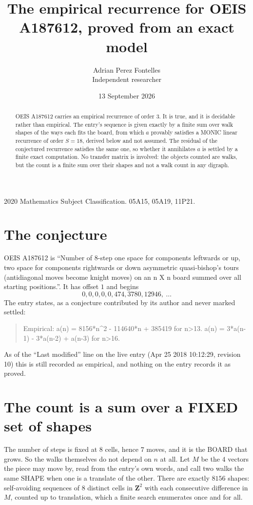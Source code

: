 \documentclass[11pt,a4paper]{article}
\title{The empirical recurrence for OEIS A187612, proved from an exact model}
\author{Adrian Perez Fontelles\\ \small Independent researcher}
\date{13 September 2026}
\theoremstyle{plain}
\theoremstyle{definition}
\begin{document}
\maketitle

\begin{abstract}
OEIS A187612 carries an empirical recurrence of order $3$. It is true, and it is
decidable rather than empirical. The entry's sequence is given exactly by a finite sum over walk shapes of the ways each fits the board, from
which $a$ provably satisfies a MONIC linear recurrence of order $S=18$, derived below and not
assumed. The residual of the conjectured recurrence satisfies the same one, so whether it
annihilates $a$ is settled by a finite exact computation. No transfer matrix is involved: the objects counted are walks, but the count is a finite sum over their shapes and not a walk count in any digraph.
\end{abstract}

\noindent\small 2020 Mathematics Subject Classification. 05A15, 05A19, 11P21.\normalsize

\section{The conjecture}

OEIS A187612 is ``Number of 8-step one space for components leftwards or up, two space for components rightwards or down asymmetric quasi-bishop's tours (antidiagonal moves become knight moves) on an n X n board summed over all starting positions.''. It has offset $1$ and begins
\[
0, 0, 0, 0, 0, 474, 3780, 12946,\ \dots
\]
The entry states, as a conjecture contributed by its author and never marked settled:
\begin{quote}
Empirical: a(n) = 8156*n\^{}2 - 114640*n + 385419 for n>13. a(n) = 3*a(n-1) - 3*a(n-2) + a(n-3) for n>16.
\end{quote}
As of the ``Last modified'' line on the live entry (Apr 25 2018 10:12:29, revision 10)
this is still recorded as empirical, and nothing on the entry records it as proved.

\section{The count is a sum over a FIXED set of shapes}

The number of steps is fixed at $8$ cells, hence $7$ moves, and it is the BOARD
that grows. So the walks themselves do not depend on $n$ at all. Let $M$ be the $4$
vectors the piece may move by, read from the entry's own words, and call two walks the same
SHAPE when one is a translate of the other. There are exactly $8156$ shapes: self-avoiding
sequences of $8$ distinct cells in $\mathbf{Z}^{2}$ with each consecutive difference in
$M$, counted up to translation, which a finite search enumerates once and for all.
\end{document}
